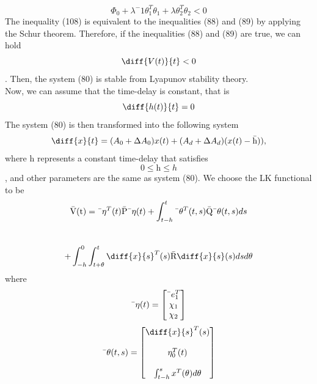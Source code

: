 \documentclass[journal]{IEEEtran}
\begin{document}
\begin{equation}
\Phi_0 + \lambda^-1\theta^{T}_{1}\theta_1 + \lambda\theta^{T}_{2}\theta_2 < 0
\end{equation}
The inequality (108) is equivalent to the inequalities (88) and (89) by applying the Schur theorem. Therefore, if the inequalities (88) and (89) are true, we can hold 
\begin{equation}
\diff{V(t)}{t} < 0
\end{equation}
. Then, the system (80) is stable from Lyapunov stability theory. 
\\
Now, we can assume that the time-delay is constant, that is
\begin{equation}
\diff{h(t)}{t} = 0
\end{equation}
The system (80) is then transformed into the following system 
\begin{equation}
 \diff{x}{t}=(A_0 + \Delta A_0)x(t) + (A_d + \Delta A_d)(x(t)-\text{\={h}})),
\end{equation}
where $\text{\={h}}$ represents a constant time-delay that satisfies
\begin{equation}
0  \leqslant \text{\={h}} \leqslant h
\end{equation}
, and other parameters are the same as system (80). We choose the LK functional to be
\begin{equation}
\text{\={V(t)}} = \text{\={$\eta^T(t)$}}\text{\={P}} \text{\={$\eta(t)$}} + \int^{t}_{t-h}\text{\={$\theta^T(t,s)$}}\text{\={Q}}\text{\={$\theta(t,s)$}}ds 
\end{equation}
\\
\begin{equation}
+ \int^{0}_{-h}\int^{t}_{t + \theta}\diff{x}{s}^T(s)\text{\={R}}\diff{x}{s}(s)dsd\theta
\end{equation}
where 
\begin{equation}
\text{\={$\eta(t)$}} = 
\begin{bmatrix}
\text{\={$e^{T}_{1}$}} \\
 \chi_1 \\
 \chi_2
\end{bmatrix}
\end{equation}
\begin{equation}
\text{\={$\theta(t,s)$}} = 
\begin{bmatrix}
\diff{x}{s}^T(s) \\ \\
 \eta^{T}_{0}(t) \\ \\
 \int^{s}_{t-h}x^T(\theta)d\theta \\
\end{bmatrix}
\end{equation}
\end{document}
